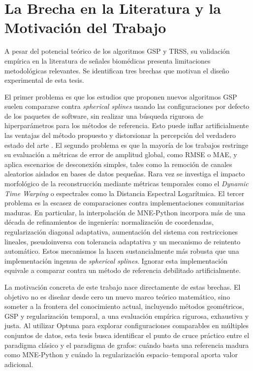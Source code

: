 \section{La Brecha en la Literatura y la Motivación del Trabajo}

A pesar del potencial teórico de los algoritmos GSP y TRSS, su validación empírica en la literatura de señales biomédicas presenta limitaciones metodológicas relevantes. Se identifican tres brechas que motivan el diseño experimental de esta tesis.

El primer problema es que los estudios que proponen nuevos algoritmos GSP suelen compararse contra \textit{spherical splines} usando las configuraciones por defecto de los paquetes de software, sin realizar una búsqueda rigurosa de hiperparámetros para los métodos de referencia. Esto puede inflar artificialmente las ventajas del método propuesto y distorsionar la percepción del verdadero estado del arte \cite{saldivia2026benchmark}. El segundo problema es que la mayoría de los trabajos restringe su evaluación a métricas de error de amplitud global, como RMSE o MAE, y aplica escenarios de desconexión simples, tales como la remoción de canales aleatorios aislados en bases de datos pequeñas. Rara vez se investiga el impacto morfológico de la reconstrucción mediante métricas temporales como el \textit{Dynamic Time Warping} o espectrales como la Distancia Espectral Logarítmica. El tercer problema es la escasez de comparaciones contra implementaciones comunitarias maduras. En particular, la interpolación de MNE-Python incorpora más de una década de refinamientos de ingeniería: normalización de coordenadas, regularización diagonal adaptativa, aumentación del sistema con restricciones lineales, pseudoinversa con tolerancia adaptativa y un mecanismo de reintento automático. Estos mecanismos la hacen sustancialmente más robusta que una implementación ingenua de \textit{spherical splines}. Ignorar esta implementación equivale a comparar contra un método de referencia debilitado artificialmente.

La motivación concreta de este trabajo nace directamente de estas brechas. El objetivo no es diseñar desde cero un nuevo marco teórico matemático, sino someter a la frontera del conocimiento actual, incluyendo métodos geométricos, GSP y regularización temporal, a una evaluación empírica rigurosa, exhaustiva y justa. Al utilizar Optuna \cite{akiba2019optuna} para explorar configuraciones comparables en múltiples conjuntos de datos, esta tesis busca identificar el punto de cruce práctico entre el paradigma clásico y el paradigma de grafos: cuándo basta una referencia madura como MNE-Python y cuándo la regularización espacio--temporal aporta valor adicional.
